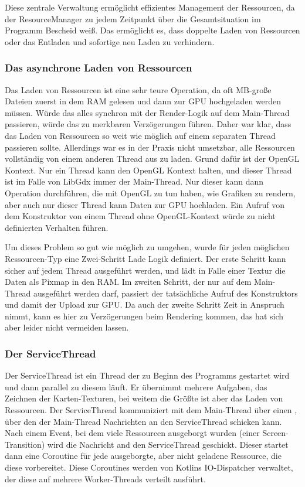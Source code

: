 Diese zentrale Verwaltung ermöglicht effizientes Management der Ressourcen, da der ResourceManager zu jedem Zeitpunkt
über die Gesamtsituation im Programm Bescheid weiß.
Das ermöglicht es, dass doppelte Laden von Ressourcen oder das Entladen und sofortige neu Laden zu verhindern.

\subsubsection{Das asynchrone Laden von Ressourcen}

Das Laden von Ressourcen ist eine sehr teure Operation, da oft MB-große Dateien zuerst in dem RAM gelesen und
dann zur GPU hochgeladen werden müssen.
Würde das alles synchron mit der Render-Logik auf dem Main-Thread passieren, würde das zu merkbaren Verzögerungen
führen.
Daher war klar, dass das Laden von Ressourcen so weit wie möglich auf einem separaten Thread passieren sollte.
Allerdings war es in der Praxis nicht umsetzbar, alle Ressourcen vollständig von einem anderen Thread aus zu laden.
Grund dafür ist der OpenGL Kontext.
Nur ein Thread kann den OpenGL Kontext halten, und dieser Thread ist im Falle von LibGdx immer der Main-Thread.
Nur dieser kann dann Operation durchführen, die mit OpenGL zu tun haben, wie \zB Grafiken zu rendern, aber auch nur
dieser Thread kann Daten zur GPU hochladen.
Ein Aufruf von \zB dem  Konstruktor von einem Thread ohne OpenGL-Kontext würde zu nicht
definierten Verhalten führen.

Um dieses Problem so gut wie möglich zu umgehen, wurde für jeden möglichen Ressourcen-Typ eine Zwei-Schritt Lade Logik
definiert.
Der erste Schritt kann sicher auf jedem Thread ausgeführt werden, und lädt \zB in Falle einer Textur die Daten als
Pixmap in den RAM\@.
Im zweiten Schritt, der nur auf dem Main-Thread ausgeführt werden darf, passiert der tatsächliche Aufruf des
 Konstruktors und damit der Upload zur GPU\@.
Da auch der zweite Schritt Zeit in Anspruch nimmt, kann es hier zu Verzögerungen beim Rendering kommen, das hat sich
aber leider nicht vermeiden lassen.

\subsubsection{Der ServiceThread}

Der ServiceThread ist ein Thread der zu Beginn des Programms gestartet wird und dann parallel zu diesem läuft.
Er übernimmt mehrere Aufgaben, \zB das Zeichnen der Karten-Texturen, bei weitem die Größte ist aber das Laden von
Ressourcen.
Der ServiceThread kommuniziert mit dem Main-Thread über einen , über
den der Main-Thread Nachrichten an den ServiceThread schicken kann.
Nach einem Event, bei dem viele Ressourcen ausgeborgt wurden (\zB einer Screen-Transition) wird die
 Nachricht and den ServiceThread geschickt.
Dieser startet dann eine Coroutine für jede ausgeborgte, aber nicht geladene Ressource, die diese vorbereitet.
Diese Coroutines werden von Kotlins IO-Dispatcher verwaltet, der diese auf mehrere Worker-Threads verteilt ausführt.

